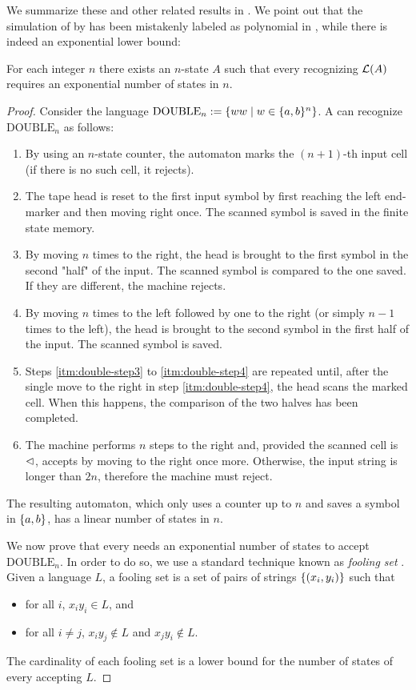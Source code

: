 We summarize these and other related results in .
We point out that the simulation of \OMODLA by \ONFA has been mistakenly labeled as polynomial in \cite{PigPri23a}, while there is indeed an exponential lower bound:
\begin{thrm}
	For each integer $n$ there exists an $n$-state \OMODLA $A$ such that every \ONFA recognizing $\mathcal L(A)$ requires an exponential number of states in $n$.
\end{thrm}
\begin{proof}
	\newcommand{\double}{\mathrm{DOUBLE}_n}
	Consider the language $\double:=\set{ww\mid w\in\set{a,b}^n}$.
	A \OMODLA can recognize $\double$ as follows:
	\begin{enumerate}
		\item By using an $n$-state counter, the automaton marks the $(n+1)$-th input cell (if there is no such cell, it rejects).
		\item The tape head is reset to the first input symbol by first reaching the left end-marker and then moving right once. The scanned symbol is saved in the finite state memory.
		\item\label{itm:double-step3} By moving $n$ times to the right, the head is brought to the first symbol in the second "half" of the input. The scanned symbol is compared to the one saved.
		      If they are different, the machine rejects.
		\item\label{itm:double-step4} By moving $n$ times to the left followed by one to the right (or simply $n-1$ times to the left), the head is brought to the second symbol in the first half of the input. The scanned symbol is saved.
		\item Steps \ref{itm:double-step3} to \ref{itm:double-step4} are repeated until, after the single move to the right in step \ref{itm:double-step4}, the head scans the marked cell. When this happens, the comparison of the two halves has been completed.
		\item The machine performs $n$ steps to the right and, provided the scanned cell is $\lhd$, accepts by moving to the right once more.
		      Otherwise, the input string is longer than $2n$, therefore the machine must reject.
	\end{enumerate}
	The resulting automaton, which only uses a counter up to $n$ and saves a symbol in $\{a,b\}$, has a linear number of states in $n$.

	We now prove that every \ONFA needs an exponential number of states to accept $\double$.
	In order to do so, we use a standard technique known as \emph{fooling set} \cite{Bir92}.
	Given a language $L$, a fooling set is a set of pairs of strings $\{(x_i,y_i)\}$ such that
	\begin{itemize}
		\item for all $i$, $x_iy_i\in L$, and
		\item for all $i\ne j$, $x_iy_j\notin L$ and $x_jy_i\notin L$.
	\end{itemize}
	The cardinality of each fooling set is a lower bound for the number of states of every \ONFA accepting $L$.


\end{proof}
